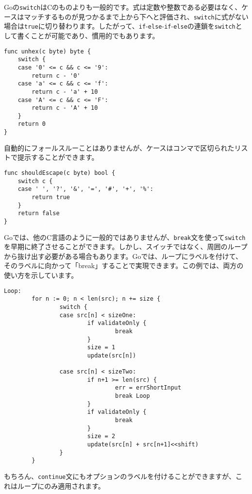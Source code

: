 \documentclass{jsarticle}
\begin{document}
Goの\texttt{switch}はCのものよりも一般的です。式は定数や整数である必要はなく、ケースはマッチするものが見つかるまで上から下へと評価され、\texttt{switch}に式がない場合は\texttt{true}に切り替わります。したがって、\texttt{if}-\texttt{else}-\texttt{if}-\texttt{else}の連鎖を\texttt{switch}として書くことが可能であり、慣用的でもあります。

\begin{lstlisting}[numbers=none]
func unhex(c byte) byte {
    switch {
    case '0' <= c && c <= '9':
        return c - '0'
    case 'a' <= c && c <= 'f':
        return c - 'a' + 10
    case 'A' <= c && c <= 'F':
        return c - 'A' + 10
    }
    return 0
}
\end{lstlisting}

自動的にフォールスルーことはありませんが、ケースはコンマで区切られたリストで提示することができます。

\begin{lstlisting}[numbers=none]
func shouldEscape(c byte) bool {
    switch c {
    case ' ', '?', '&', '=', '#', '+', '%':
        return true
    }
    return false
}
\end{lstlisting}

Goでは、他のC言語のように一般的ではありませんが、\texttt{break}文を使って\texttt{switch}を早期に終了させることができます。しかし、スイッチではなく、周囲のループから抜け出す必要がある場合もあります。Goでは、ループにラベルを付けて、そのラベルに向かって「break」することで実現できます。この例では、両方の使い方を示しています。

\begin{lstlisting}[numbers=none]
Loop:
        for n := 0; n < len(src); n += size {
                switch {
                case src[n] < sizeOne:
                        if validateOnly {
                                break
                        }
                        size = 1
                        update(src[n])

                case src[n] < sizeTwo:
                        if n+1 >= len(src) {
                                err = errShortInput
                                break Loop
                        }
                        if validateOnly {
                                break
                        }
                        size = 2
                        update(src[n] + src[n+1]<<shift)
                }
        }
\end{lstlisting}

もちろん、\texttt{continue}文にもオプションのラベルを付けることができますが、これはループにのみ適用されます。
\end{document}
